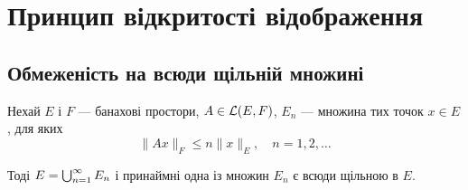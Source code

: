 \chapter{Принцип відкритості відображення}

\section{Обмеженість на всюди щільній множині}

\begin{lemma}
Нехай $E$ і $F$ --- банахові простори,
$A \in \mathcal{L}(E, F)$, $E_n$ --- множина тих точок $x \in E$, для яких
\begin{equation*}
    \|A x\|_F \le n \|x\|_E, \quad n = 1, 2, \dots    
\end{equation*}

Тоді $E = \operatorname*{\bigcup}_{n = 1}^\infty E_n$ і принаймні одна із множин $E_n$ є всюди
щільною в $E$.
\end{lemma}


